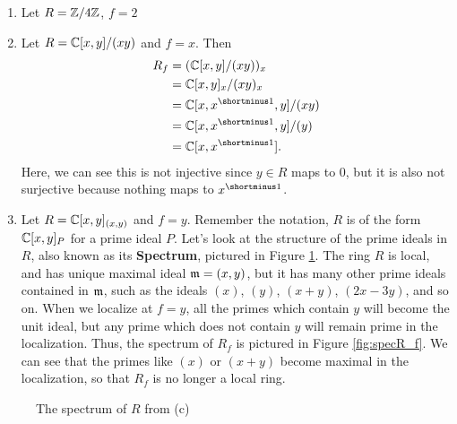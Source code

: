 \begin{solution}
\begin{enumerate}
    \item Let $R = \mathbb{Z}/4\mathbb{Z}$, $f = 2$
    \item Let $R = \mathbb{C}[x,y]/(xy)$ and $f = x$. Then
    \begin{align*}
        R_f &= (\C[x,y]/(xy))_x\\
        &= \C[x,y]_x/(xy)_x\\
        &= \C[x,x\inv,y]/(xy)\\
        &= \C[x,x\inv,y]/(y)\\
        &= \C[x,x\inv].
    \end{align*}
    Here, we can see this is not injective since $y \in R$ maps to 0, but it is also not surjective because nothing maps to $x\inv$.
    \item Let $R = \mathbb{C}[x,y]_{(x,y)}$ and $f = y$. Remember the notation, $R$ is of the form $\mathbb{C}[x,y]_P$ for a prime ideal $P$. Let's look at the structure of the prime ideals in $R$, also known as its \textbf{Spectrum}, pictured in Figure \ref{fig:specR}. The ring $R$ is local, and has unique maximal ideal $\mathfrak{m} = (x,y)$, but it has many other prime ideals contained in $\mathfrak{m}$, such as the ideals $(x)$, $(y)$, $(x+y)$, $(2x-3y)$, and so on. When we localize at $f=y$, all the primes which contain $y$ will become the unit ideal, but any prime which does not contain $y$ will remain prime in the localization. Thus, the spectrum of $R_f$ is pictured in Figure \ref{fig:specR_f}. We can see that the primes like $(x)$ or $(x+y)$ become maximal in the localization, so that $R_f$ is no longer a local ring.
\end{enumerate}

\begin{figure}[hbt]
\centering
{}
\caption{The spectrum of $R$ from \hyperref[qu:Jan18_1]{}(c)}
\label{fig:specR}
\end{figure}


\end{solution}
